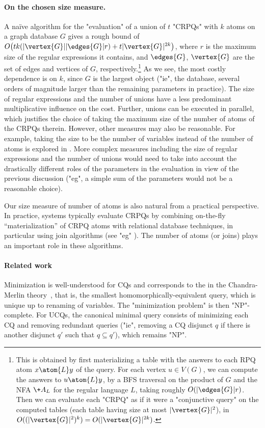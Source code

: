 \paragraph{On the chosen size measure.}
A na\"ive algorithm for the "evaluation" of a union of $t$ "CRPQs" with $k$ atoms on a graph database $G$ gives a rough bound of $O\big(t  k  (|\vertex{G}||\edges{G}| r) + t  |\vertex{G}|^{2k}\big)$, where $r$ is the maximum size of the regular expressions it contains, and $\edges{G}$, $\vertex{G}$ are the set of edges and vertices of $G$, respectively.\footnote{This is obtained by first materializing a table with the answers to each RPQ atom $x \atom{L} y$ of the query. For each vertex $u\in V(G)$, we can compute the answers to $u \atom{L} y$, by a BFS traversal on the product of $G$ and   the NFA $\+A_L$ for the regular language $L$, taking roughly $O(|\edges{G}| r)$. Then we can evaluate each "CRPQ" as if it were a "conjunctive query" on the computed tables (each table having size at most $|\vertex{G}|^2$), in $O((|\vertex{G}|^2)^k) = O(|\vertex{G}|^{2k})$.}
As we see, the most costly dependence is on $k$, since $G$ is the largest object ("ie", the database, several orders of magnitude larger than the remaining parameters in practice). The size of regular expressions and the number of unions have a less predominant multiplicative influence on the cost.
Further, unions can be executed in parallel, which justifies the choice of taking the maximum size of the number of atoms of the CRPQs therein.
However, other measures may also be reasonable. For example, taking the size to be the number of variables instead of the number of atoms is explored in .
More complex measures including the size of regular expressions and the number of unions would need to take into account the drastically different roles of the parameters in the evaluation in view of the previous discussion ("eg", a simple sum of the parameters would not be a reasonable choice).

Our size measure of number of atoms is also natural from a practical perspective. In practice, systems typically evaluate CRPQs by combining   on-the-fly ``materialization'' of CRPQ atoms  with  relational database techniques, in particular using join algorithms (see "eg" \cite{milleniumDB24,eswc-crpqs24,cucumides-icdt23}).  The number of atoms (or joins) plays an important role in these algorithms.
	
\paragraph{Related work}
Minimization is well-understood for CQs and corresponds to the  in the Chandra-Merlin theory~\cite{DBLP:conf/stoc/ChandraM77}, that is, the smallest homomorphically-equivalent query, which is unique up to renaming of variables. The "minimization problem" is then "NP"-complete.
For UCQs, the canonical minimal query consists of minimizing each CQ and removing redundant queries ("ie", removing a CQ disjunct $q$ if there is another disjunct $q'$ such that $q \subseteq q'$), which remains "NP".


